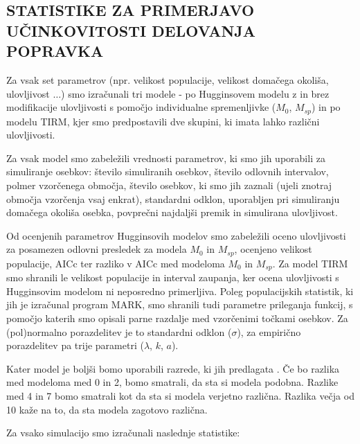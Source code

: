 \subsection{STATISTIKE ZA PRIMERJAVO UČINKOVITOSTI DELOVANJA POPRAVKA}
Za vsak set parametrov (npr. velikost populacije, velikost domačega okoliša, ulovljivost $\ldots$) smo izračunali tri modele - po Hugginsovem modelu z in brez modifikacije ulovljivosti s pomočjo individualne spremenljivke ($M_0$, $M_{sp}$) in po modelu TIRM, kjer smo predpostavili dve skupini, ki imata lahko različni ulovljivosti.

Za vsak model smo zabeležili vrednosti parametrov, ki smo jih uporabili za simuliranje osebkov: število simuliranih osebkov, število odlovnih intervalov, polmer vzorčenega območja, število osebkov, ki smo jih zaznali (ujeli znotraj območja vzorčenja vsaj enkrat), standardni odklon, uporabljen pri simuliranju domačega okoliša osebka, povprečni najdaljši premik in simulirana ulovljivost.

Od ocenjenih parametrov Hugginsovih modelov smo zabeležili oceno ulovljivosti za posamezen odlovni presledek za modela $M_0$ in $M_{sp}$, ocenjeno velikost populacije, AICc ter razliko v AICc med modeloma $M_0$ in $M_{sp}$. Za model TIRM smo shranili le velikost populacije in interval zaupanja, ker ocena ulovljivosti s Hugginsovim modelom ni neposredno primerljiva.
Poleg populacijskih statistik, ki jih je izračunal program MARK, smo shranili tudi parametre prileganja funkcij, s pomočjo katerih smo opisali parne razdalje med vzorčenimi točkami osebkov. Za (pol)normalno porazdelitev je to standardni odklon ($\sigma$), za empirično porazdelitev pa trije parametri ($\lambda$, $k$, $a$).

Kater model je boljši bomo uporabili razrede, ki jih predlagata \citet{burnham_model_2002}. Če bo razlika med modeloma med 0 in 2, bomo smatrali, da sta si modela podobna. Razlike med 4 in 7 bomo smatrali kot da sta si modela verjetno različna. Razlika večja od 10 kaže na to, da sta modela zagotovo različna.


Za vsako simulacijo smo izračunali naslednje statistike:

